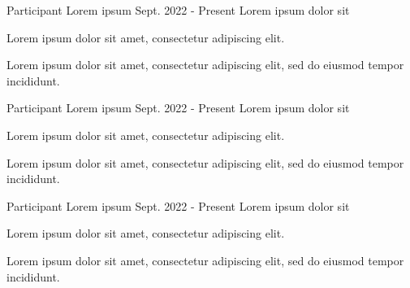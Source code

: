 
\begin{cventries}

    \cventry
      {Participant} %
      {Lorem ipsum} %
      {Sept. 2022 - Present} %
      {Lorem ipsum dolor sit} %
      {
        \begin{cvitems} %
          \item {Lorem ipsum dolor sit amet, consectetur adipiscing elit.}
          \item {Lorem ipsum dolor sit amet, consectetur adipiscing elit, sed do eiusmod tempor incididunt.}
        \end{cvitems}
      }\newline
      \newline

    \cventry
    {Participant} %
    {Lorem ipsum} %
    {Sept. 2022 - Present} %
    {Lorem ipsum dolor sit} %
    {
      \begin{cvitems} %
        \item {Lorem ipsum dolor sit amet, consectetur adipiscing elit.}
        \item {Lorem ipsum dolor sit amet, consectetur adipiscing elit, sed do eiusmod tempor incididunt.}
      \end{cvitems}
    }\newline
    \newline

    \cventry
    {Participant} %
    {Lorem ipsum} %
    {Sept. 2022 - Present} %
    {Lorem ipsum dolor sit} %
    {
      \begin{cvitems} %
        \item {Lorem ipsum dolor sit amet, consectetur adipiscing elit.}
        \item {Lorem ipsum dolor sit amet, consectetur adipiscing elit, sed do eiusmod tempor incididunt.}
      \end{cvitems}
    }\newline
    \newline

\end{cventries}
